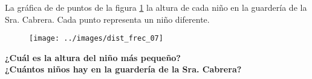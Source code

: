 \question[10] La gráfica de de puntos de la figura \ref{fig:dist_frec_07}  la altura de cada niño en la guardería de la Sra. Cabrera.
Cada punto representa un niño diferente.
\begin{figure}[H]
    \begin{center}
        \texttt{[image: ../images/dist\_frec\_07]}
    \end{center}
    \caption{}
    \label{fig:dist_frec_07}
\end{figure}
\textbf{¿Cuál es la altura del niño más pequeño?}\\
\textbf{¿Cuántos niños hay en la guardería de la Sra. Cabrera?}
